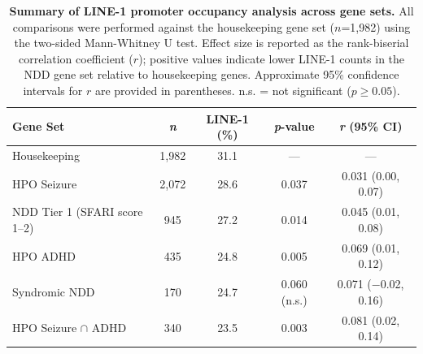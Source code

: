 \documentclass[11pt, a4paper]{article}
\begin{document}
\begin{table}[htbp]
\centering
\caption{\textbf{Summary of LINE-1 promoter occupancy analysis
across gene sets.} All comparisons were performed against the
housekeeping gene set ($n$=1,982) using the two-sided
Mann-Whitney U test.
Effect size is reported as the
rank-biserial correlation coefficient ($r$); positive values
indicate lower LINE-1 counts in the NDD gene set relative
to housekeeping genes.
Approximate 95\% confidence intervals
for $r$ are provided in parentheses. n.s.
= not significant
($p \geq 0.05$).}
\label{tab:main}
\small
\begin{tabularx}{\textwidth}{>{\raggedright\arraybackslash}Xcccc}
\toprule
\textbf{Gene Set} &
\textbf{\textit{n}} &
\textbf{LINE-1 (\%)} &
\textbf{\textit{p}-value} &
\textbf{\textit{r} (95\% CI)} \\
\midrule
Housekeeping
  & 1,982 & 31.1 & --- & --- \\
HPO Seizure
  & 2,072 & 28.6 & 0.037 & 0.031 (0.00, 0.07) \\
NDD Tier 1 (SFARI score 1--2)
  &   945 & 27.2 & 0.014 & 0.045 (0.01, 0.08) \\
HPO ADHD
  &   435 & 24.8 & 0.005 & 0.069 (0.01, 0.12) \\
Syndromic NDD
  &   170 & 24.7 & 0.060 (n.s.) & 0.071 ($-$0.02, 0.16) \\
HPO Seizure $\cap$ ADHD
  &   340 & 23.5 & 0.003 & 
0.081 (0.02, 0.14) \\
\bottomrule
\end{tabularx}
\normalsize
\end{table}

\footnotesize

\setlength{\bibsep}{0pt}

\end{document}
